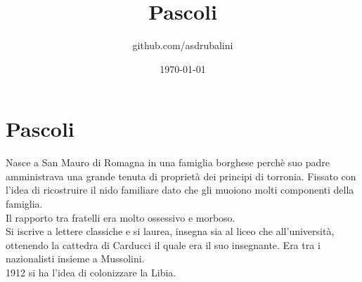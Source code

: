 \documentclass{article}
\title{Pascoli}
\author{github.com/asdrubalini}
\date{\today}
\begin{document}
    \maketitle

    \section{Pascoli}
    Nasce a San Mauro di Romagna in una famiglia borghese perchè suo padre amministrava una grande tenuta di proprietà dei principi di torronia. Fissato con l'idea di ricostruire il nido familiare dato che gli muoiono molti componenti della famiglia.
    \\
    Il rapporto tra fratelli era molto ossessivo e morboso.
    \\
    Si iscrive a lettere classiche e si laurea, insegna sia al liceo che all'università, ottenendo la cattedra di Carducci il quale era il suo insegnante. Era tra i nazionalisti insieme a Mussolini.
    \\
    1912 si ha l'idea di colonizzare la Libia.
\end{document}
